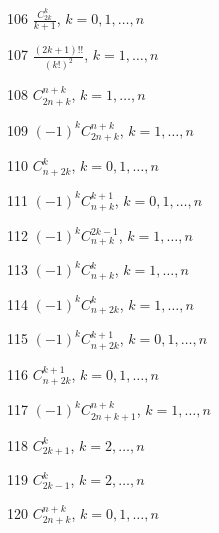 \documentclass[11pt, russian]{article}
\begin{document}
106 
$\frac{C_{2k}^k}{k+1}$, $k=0,1,\ldots,n$\par\vspace{5mm}

107 
$\frac{(2k+1)!!}{(k!)^2}$, $k=1,\ldots,n$\par\vspace{5mm}

108 
$C_{2n+k}^{n+k}$, $k=1,\ldots,n$\par\vspace{5mm}

109 
$(-1)^{k}C_{2n+k}^{n+k}$, $k=1,\ldots,n$\par\vspace{5mm}

110 
$C_{n+2k}^{k}$, $k=0,1,\ldots,n$\par\vspace{5mm}

111 
$(-1)^{k}C_{n+k}^{k+1}$, $k=0,1,\ldots,n$\par\vspace{5mm}

112 
$(-1)^{k}C_{n+k}^{2k-1}$, $k=1,\ldots,n$\par\vspace{5mm}

113 
$(-1)^{k}C_{n+k}^{k}$, $k=1,\ldots,n$\par\vspace{5mm}

114 
$(-1)^{k}C_{n+2k}^{k}$, $k=1,\ldots,n$\par\vspace{5mm}

115 
$(-1)^{k}C_{n+2k}^{k+1}$, $k=0,1,\ldots,n$\par\vspace{5mm}

116 
$C_{n+2k}^{k+1}$, $k=0,1,\ldots,n$\par\vspace{5mm}

117 
$(-1)^{k}C_{2n+k+1}^{n+k}$, $k=1,\ldots,n$\par\vspace{5mm}

118 
$C_{2k+1}^{k}$, $k=2,\ldots,n$\par\vspace{5mm}

119 
$C_{2k-1}^{k}$, $k=2,\ldots,n$\par\vspace{5mm}

120 
$C_{2n+k}^{n+k}$, $k=0,1,\ldots,n$\par\vspace{5mm}
\end{document}
